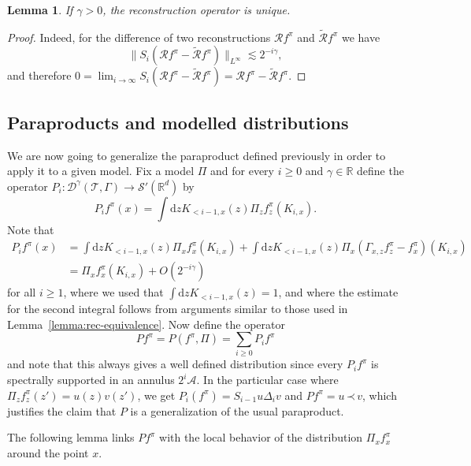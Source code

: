 \documentclass[a4paper,11pt]{article}
\newcommand{\mathd}{\mathrm{d}}
\newtheorem{lemma}[theorem]{Lemma}
\theoremstyle{remark}
\newcommand{\R}{\mathbb{R}}
\newcommand{\CA}{\ensuremath{\mathscr{A}}}
\newcommand{\lpara}{\,\mathord{\prec}\,}
\begin{document}
\begin{lemma}
  If $\gamma > 0$, the reconstruction operator is unique.
\end{lemma}

\begin{proof}
  Indeed, for the difference of two reconstructions $\mathcal{R}f^{\pi}$ and
  $\tilde{\mathcal{R}} f^{\pi}$ we have
  \[
     \| S_{i} (\mathcal{R}f^{\pi} - \tilde{\mathcal{R}} f^{\pi}) \|_{L^\infty} \lesssim 2^{-i \gamma},
  \]
  and therefore $0 = \lim_{i\to \infty}  S_{i} (\mathcal{R}f^{\pi} - \tilde{\mathcal{R}} f^{\pi}) = \mathcal{R}f^{\pi} - \tilde{\mathcal{R}} f^{\pi}$.
\end{proof}

\subsection{Paraproducts and modelled distributions}

We are now going to generalize the paraproduct defined previously in order to
apply it to a given model. Fix a model $\Pi$ and for every $i \geqslant 0$ and $\gamma \in \R$
define the operator $P_{i} :\mathcal{D}^{\gamma} ( \mathcal{T}, \Gamma ) \rightarrow \mathcal{S}' (
\R^{d} )$ by
\[
   P_{i}  f^{\pi} ( x ) = \int \mathd zK_{< i-1,x} ( z ) \Pi_{z} f^{\pi}_{z} ( K_{i,x} ) .
\]
Note that
\begin{align*}
   P_{i} f^{\pi} ( x ) & = \int \mathd zK_{< i-1,x} ( z ) \Pi_{x} f^{\pi}_{x} ( K_{i,x} ) + \int \mathd zK_{< i-1,x} ( z ) \Pi_{x} (\Gamma_{x,z} f^{\pi}_{z} -f^{\pi}_{x} ) ( K_{i,x} ) \\
   & = \Pi_{x} f^{\pi}_{x} ( K_{i,x} ) +O ( 2^{-i \gamma} )
\end{align*}
for all $i \geqslant 1$, where we used that $\int \mathd z K_{<i-1,x}(z) =1$, and where the estimate for the second integral follows from arguments similar to
those used in Lemma~\ref{lemma:rec-equivalence}. Now define the operator
\[
   P f^{\pi} = P(f^\pi, \Pi) = \sum_{i \geqslant 0} P_{i} f^{\pi}
\]
and note that this always gives a well defined distribution since every $P_{i} f^{\pi}$ is spectrally supported in an annulus $2^{i} \CA$. In the particular case where $\Pi_{z} f^{\pi}_{z} ( z' ) =u(z) v ( z' )$, we get $P_{i} ( f^{\pi} ) = S_{i-1} u \Delta_{i} v$ and $P f^{\pi} =u \lpara v$, which justifies the claim that $P$ is a generalization of
the usual paraproduct.

The following lemma links $P f^{\pi}$ with the local behavior of the
distribution $\Pi_{x} f^{\pi}_{x}$ around the point $x$.
\end{document}
